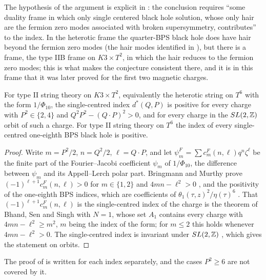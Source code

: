 The hypothesis of the argument is explicit in \cite{Sen11positivity}: the conclusion requires ``some duality frame in which only single centered black hole solution, whose only hair are the fermion zero modes associated with broken supersymmetry, contributes'' to the index. In the heterotic frame the quarter-BPS black hole does have hair beyond the fermion zero modes (the hair modes identified in \cite{BMS09hair}), but there is a frame, the type IIB frame on $K3\times T^2$, in which the hair reduces to the fermion zero modes; this is what makes the conjecture consistent there, and it is in this frame that it was later proved for the first two magnetic charges.

\begin{theorem}\label{thm:bringmannmurthy}
For type II string theory on $K3\times T^2$, equivalently the heterotic string on $T^6$ with the form $1/\Phi_{10}$, the single-centred index $d^*(Q,P)$ is positive for every charge with $P^2\in\{2,4\}$ and $Q^2P^2-(Q\cdot P)^2>0$, and for every charge in the $SL(2,\mathbb{Z})$ orbit of such a charge. For type II string theory on $T^6$ the index of every single-centred one-eighth BPS black hole is positive.
\end{theorem}

\begin{proof}
Write $m=P^2/2$, $n=Q^2/2$, $\ell=Q\cdot P$, and let $\psi^F_m=\sum c^F_m(n,\ell)q^n\zeta^\ell$ be the finite part of the Fourier--Jacobi coefficient $\psi_m$ of $1/\Phi_{10}$, the difference between $\psi_m$ and its Appell--Lerch polar part. Bringmann and Murthy prove $(-1)^{\ell+1}c^F_m(n,\ell)>0$ for $m\in\{1,2\}$ and $4mn-\ell^2>0$ \cite[(3.8) and Sections~4--6]{BringmannMurthy13}, and the positivity of the one-eighth BPS indices, which are coefficients of $\theta_1(\tau,z)^2/\eta(\tau)^6$ \cite[case (1a)]{BringmannMurthy13}. That $(-1)^{\ell+1}c^F_m(n,\ell)$ is the single-centred index of the charge is the theorem of Bhand, Sen and Singh \cite[Theorem~5.4(a)]{BSS25} with $N=1$, whose set $A_1$ \cite[(5.64)]{BSS25} contains every charge with $4mn-\ell^2\ge m^2$, $m$ being the index of the form; for $m\le 2$ this holds whenever $4mn-\ell^2>0$. The single-centred index is invariant under $SL(2,\mathbb{Z})$ \cite[Section~5.3]{BSS25}, which gives the statement on orbits.
\end{proof}

The proof of \cite{BringmannMurthy13} is written for each index separately, and the cases $P^2\ge 6$ are not covered by it.

